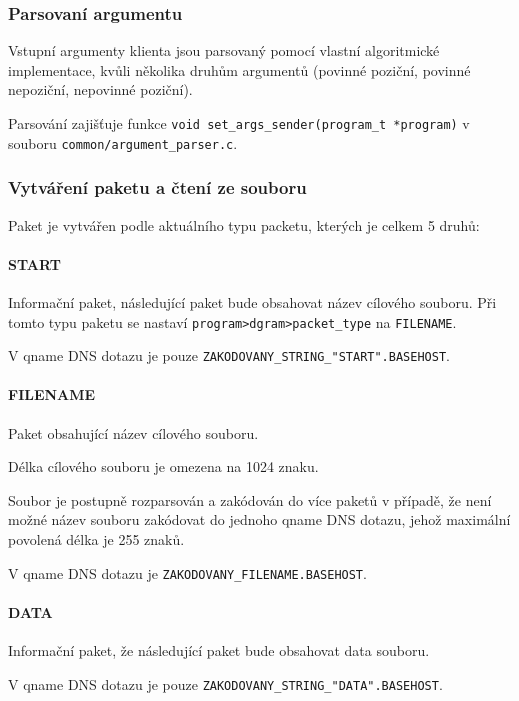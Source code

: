\subsubsection{Parsovaní argumentu} \label{sec:parsovani-argumentu-k}
Vstupní argumenty klienta jsou parsovaný pomocí vlastní algoritmické
implementace, kvůli několika druhům argumentů
(povinné poziční, povinné nepoziční, nepovinné poziční).

Parsování zajišťuje funkce \texttt{void set\_args\_sender(program\_t *program)}
v souboru \texttt{common/argument\_parser.c}.

\subsubsection{Vytváření paketu a čtení ze souboru} \label{sec:vytvareni-paketu-k}

Paket je vytvářen podle aktuálního typu packetu, kterých je celkem 5 druhů:

\paragraph{START}
Informační paket, následující paket bude obsahovat název cílového souboru.
Při tomto typu paketu se nastaví \texttt{program\->dgram\->packet\_type} na \texttt{FILENAME}.

V qname DNS dotazu je pouze \texttt{ZAKODOVANY\_STRING\_"START".BASEHOST}.

\paragraph{FILENAME}
Paket obsahující název cílového souboru.

Délka cílového souboru je omezena na 1024 znaku.

Soubor je postupně rozparsován a zakódován
do více paketů v případě, že není možné název souboru
zakódovat do jednoho qname DNS dotazu,
jehož maximální povolená délka je 255 znaků\cite{dnsPacketInfo}.

V qname DNS dotazu je \texttt{ZAKODOVANY\_FILENAME.BASEHOST}.

\paragraph{DATA}
Informační paket, že následující paket bude obsahovat data souboru.

V qname DNS dotazu je pouze \texttt{ZAKODOVANY\_STRING\_"DATA".BASEHOST}.

